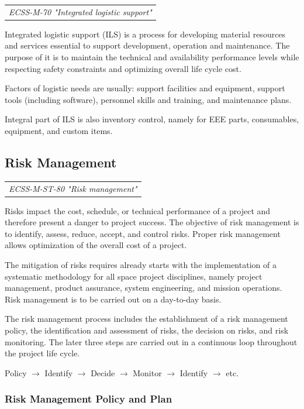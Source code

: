 \begin{tabular}{l}
\textit{ECSS-M-70 "Integrated logistic support" \cite{ECSS-M-70}}
\end{tabular}

Integrated logistic support (ILS) is a process for developing material resources and services essential to support development, operation and maintenance. The purpose of it is to maintain the technical and availability performance levels while respecting safety constraints and optimizing overall life cycle cost.

Factors of logistic needs are usually: support facilities and equipment, support tools (including software), personnel skills and training, and maintenance plans.  

Integral part of ILS is also inventory control, namely for EEE parts, consumables, equipment, and custom items.

\subsection{Risk Management}
\label{sec:Risk Management}

\begin{tabular}{l}
\textit{ECSS-M-ST-80 "Risk management" \cite{ECSS-M-ST-80}}
\end{tabular}

Risks impact the cost, schedule, or technical performance of a project and therefore present a danger to project success. The objective of risk management is to identify, assess, reduce, accept, and control risks. Proper risk management allows optimization of the overall cost of a project.

The mitigation of risks requires already starts with the implementation of a systematic methodology for all space project disciplines, namely project management, product assurance, system engineering, and mission operations. Risk management is to be carried out on a day-to-day basis.

The risk management process includes the establishment of a risk management policy, the identification and assessment of risks, the decision on risks, and risk monitoring. The later three steps are carried out in a continuous loop throughout the project life cycle.

Policy
$\rightarrow$ Identify
$\rightarrow$ Decide
$\rightarrow$ Monitor
$\rightarrow$ Identify
$\rightarrow$ etc.

\subsubsection{Risk Management Policy and Plan}

